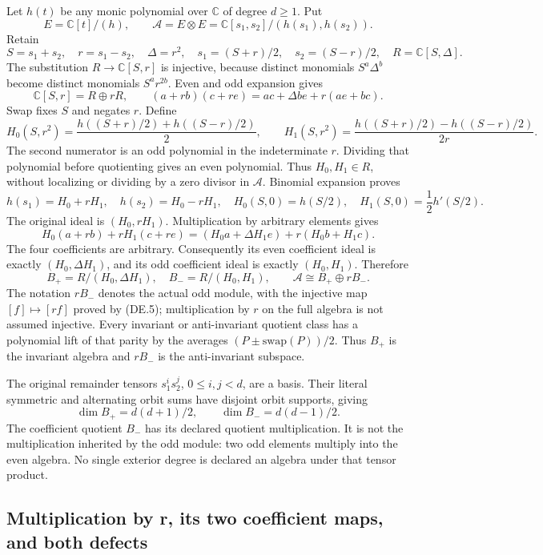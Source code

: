 Let \(h(t)\) be any monic polynomial over \(\mathbb C\) of degree \(d\ge1\). Put
\[
 E=\mathbb C[t]/(h),\qquad
 \mathcal A=E\otimes E=\mathbb C[s_1,s_2]/(h(s_1),h(s_2)).
\]
Retain
\[
 S=s_1+s_2,\quad r=s_1-s_2,\quad\Delta=r^2,\quad
 s_1=(S+r)/2,\quad s_2=(S-r)/2,\quad R=\mathbb C[S,\Delta].
 \tag{DE.1}
\]
The substitution \(R\to\mathbb C[S,r]\) is injective, because distinct monomials \(S^a\Delta^b\) become distinct monomials \(S^ar^{2b}\). Even and odd expansion gives
\[
 \mathbb C[S,r]=R\oplus rR,\qquad
 (a+rb)(c+re)=ac+\Delta be+r(ae+bc).
 \tag{DE.2}
\]
Swap fixes \(S\) and negates \(r\). Define
\[
 H_0(S,r^2)=\frac{h((S+r)/2)+h((S-r)/2)}2,\qquad
 H_1(S,r^2)=\frac{h((S+r)/2)-h((S-r)/2)}{2r}.
 \tag{DE.3}
\]
The second numerator is an odd polynomial in the indeterminate \(r\). Dividing that polynomial before quotienting gives an even polynomial. Thus \(H_0,H_1\in R\), without localizing or dividing by a zero divisor in \(\mathcal A\). Binomial expansion proves
\[
 h(s_1)=H_0+rH_1,\quad h(s_2)=H_0-rH_1,\quad
 H_0(S,0)=h(S/2),\quad H_1(S,0)=\frac12h'(S/2).
 \tag{DE.4}
\]
The original ideal is \((H_0,rH_1)\). Multiplication by arbitrary elements gives
\[
 H_0(a+rb)+rH_1(c+re)
 =(H_0a+\Delta H_1e)+r(H_0b+H_1c).
 \tag{DE.5}
\]
The four coefficients are arbitrary. Consequently its even coefficient ideal is exactly \((H_0,\Delta H_1)\), and its odd coefficient ideal is exactly \((H_0,H_1)\). Therefore
\[
 B_+=R/(H_0,\Delta H_1),\quad B_-=R/(H_0,H_1),\qquad
 \mathcal A\cong B_+\oplus rB_-.
 \tag{DE.6}
\]
The notation \(rB_-\) denotes the actual odd module, with the injective map \([f]\mapsto[rf]\) proved by (DE.5); multiplication by \(r\) on the full algebra is not assumed injective. Every invariant or anti-invariant quotient class has a polynomial lift of that parity by the averages \((P\pm\mathrm{swap}(P))/2\). Thus \(B_+\) is the invariant algebra and \(rB_-\) is the anti-invariant subspace.

The original remainder tensors \(s_1^is_2^j\), \(0\le i,j<d\), are a basis. Their literal symmetric and alternating orbit sums have disjoint orbit supports, giving
\[
 \dim B_+=d(d+1)/2,\qquad \dim B_-=d(d-1)/2.
 \tag{DE.7}
\]
The coefficient quotient \(B_-\) has its declared quotient multiplication. It is not the multiplication inherited by the odd module: two odd elements multiply into the even algebra. No single exterior degree is declared an algebra under that tensor product.

\subsection{Multiplication by r, its two coefficient maps, and both defects}

